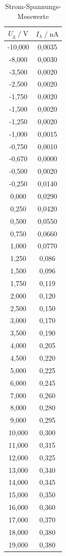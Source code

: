 \begin{table}
    \centering
    \caption{Strom-Spannungs-Messwerte}
    \label{tab:stsp}
    \begin{tabular}{c c}
    \toprule
    $ U_\text{g} \;/\; \si{\volt} $ & $I_\lambda \;/\; \si{\nano\ampere}$\\
    \midrule 
      -10,000 & 0,0035\\
       -8,000 & 0,0030\\
       -3,500 & 0,0020\\
       -2,500 & 0,0020\\
       -1,750 & 0,0020\\
       -1,500 & 0,0020\\
       -1,250 & 0,0020\\
       -1,000 & 0,0015\\
       -0,750 & 0,0010\\
       -0,670 & 0,0000\\ 
       -0,500 & 0,0020\\
       -0,250 & 0,0140\\
        0,000 & 0,0290\\
        0,250 & 0,0420\\
        0,500 & 0,0550\\
        0,750 & 0,0660\\
        1,000 & 0,0770\\
        1,250 & 0,086\\
        1,500 & 0,096\\
        1,750 & 0,119\\
        2,000 & 0,120\\
        2,500 & 0,150\\
        3,000 & 0,170\\
        3,500 & 0,190\\
        4,000 & 0,205\\
        4,500 & 0,220\\
        5,000 & 0,225\\
        6,000 & 0,245\\
        7,000 & 0,260\\
        8,000 & 0,280\\
        9,000 & 0,295\\
       10,000 & 0,300\\
       11,000 & 0,315\\
       12,000 & 0,325\\
       13,000 & 0,340\\
       14,000 & 0,345\\
       15,000 & 0,350\\
       16,000 & 0,360\\
       17,000 & 0,370\\
       18,000 & 0,380\\
       19,000 & 0,380\\
       \bottomrule
    \end{tabular}
\end{table}

